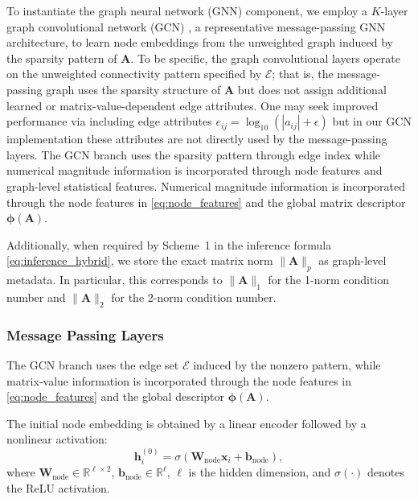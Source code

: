 \documentclass[11pt,a4paper]{article}
\theoremstyle{plain}
\theoremstyle{definition}
\theoremstyle{remark}
\begin{document}
To instantiate the graph neural network (GNN) component, we employ a $K$-layer graph convolutional network (GCN) \cite{kipf2017semi}, a representative message-passing GNN architecture, to learn node embeddings from the unweighted graph induced by the sparsity pattern of $\mathbf{A}$. To be specific, the graph convolutional layers operate on the unweighted connectivity pattern specified by $\mathcal{E}$; that is, the message-passing graph uses the sparsity structure of $\mathbf{A}$ but does not assign additional learned or matrix-value-dependent edge attributes. One may seek improved performance via including edge attributes $e_{ij}=\log_{10}(|a_{ij}|+\epsilon)$ but in our GCN implementation these attributes are not directly used by the message-passing layers. The GCN branch uses the sparsity pattern through edge index while numerical magnitude information is incorporated through node features and graph-level statistical features. Numerical magnitude information is incorporated through the node features in \eqref{eq:node_features} and the global matrix descriptor $\bm{\phi}(\mathbf{A})$.

Additionally, when required by Scheme~1 in the inference formula \eqref{eq:inference_hybrid}, we store the exact matrix norm $\|\mathbf{A}\|_p$ as graph-level metadata. In particular, this corresponds to $\|\mathbf{A}\|_1$ for the 1-norm condition number and $\|\mathbf{A}\|_2$ for the 2-norm condition number.


\subsubsection{Message Passing Layers}
 The GCN branch uses the edge set $\mathcal{E}$ induced by the nonzero pattern, while matrix-value information is incorporated through the node features in \eqref{eq:node_features} and the global descriptor $\bm{\phi}(\mathbf{A})$.

The initial node embedding is obtained by a linear encoder followed by a nonlinear activation:
\begin{equation}
\mathbf{h}_i^{(0)}
=
\sigma\left(
\mathbf{W}_{\mathrm{node}}\mathbf{x}_i
+
\mathbf{b}_{\mathrm{node}}
\right),
\label{eq:node_encoder}
\end{equation}
where $\mathbf{W}_{\mathrm{node}}\in\mathbb{R}^{\ell\times 2}$, $\mathbf{b}_{\mathrm{node}}\in\mathbb{R}^{\ell}$, $\ell$ is the hidden dimension, and $\sigma(\cdot)$ denotes the ReLU activation.
\end{document}
